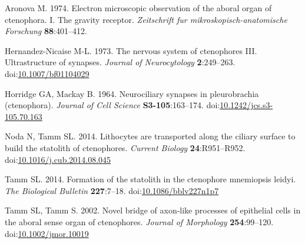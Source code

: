 \documentclass[
  11pt,
]{article}
\newlength{\cslhangindent}
\newenvironment{CSLReferences}[2] %
 {\begin{list}{}{%
  \setlength{\itemindent}{0pt}
  \setlength{\leftmargin}{0pt}
  \setlength{\parsep}{0pt}
  \ifodd #1
   \setlength{\leftmargin}{\cslhangindent}
   \setlength{\itemindent}{-1\cslhangindent}
  \fi
  \setlength{\itemsep}{#2\baselineskip}}}
 {\end{list}}
\begin{document}
\label{refs}
\begin{CSLReferences}{1}{0}
Aronova M. 1974. Electron microscopic observation of the aboral organ of
ctenophora. I. The gravity receptor. \emph{Zeitschrift fur
mikroskopisch-anatomische Forschung} \textbf{88}:401--412.

Hernandez-Nicaise M-L. 1973. The nervous system of ctenophores III.
Ultrastructure of synapses. \emph{Journal of Neurocytology}
\textbf{2}:249--263.
doi:\href{https://doi.org/10.1007/bf01104029}{10.1007/bf01104029}

Horridge GA, Mackay B. 1964. Neurociliary synapses in pleurobrachia
(ctenophora). \emph{Journal of Cell Science} \textbf{S3-105}:163--174.
doi:\href{https://doi.org/10.1242/jcs.s3-105.70.163}{10.1242/jcs.s3-105.70.163}

Noda N, Tamm SL. 2014. Lithocytes are transported along the ciliary
surface to build the statolith of ctenophores. \emph{Current Biology}
\textbf{24}:R951--R952.
doi:\href{https://doi.org/10.1016/j.cub.2014.08.045}{10.1016/j.cub.2014.08.045}

Tamm SL. 2014. Formation of the statolith in the ctenophore mnemiopsis
leidyi. \emph{The Biological Bulletin} \textbf{227}:7--18.
doi:\href{https://doi.org/10.1086/bblv227n1p7}{10.1086/bblv227n1p7}

Tamm SL, Tamm S. 2002. Novel bridge of axon‐like processes of epithelial
cells in the aboral sense organ of ctenophores. \emph{Journal of
Morphology} \textbf{254}:99--120.
doi:\href{https://doi.org/10.1002/jmor.10019}{10.1002/jmor.10019}

\end{CSLReferences}
\end{document}
